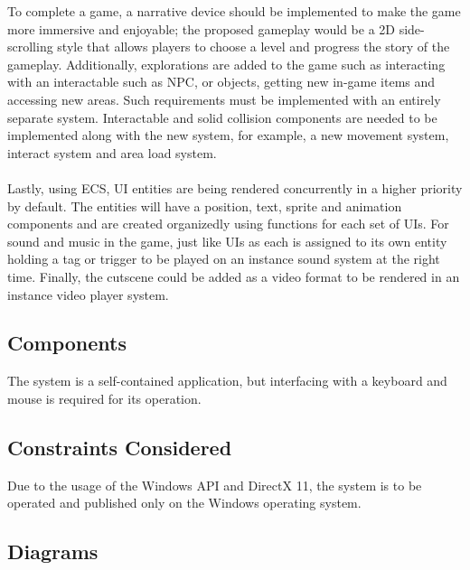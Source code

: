 To complete a game, a narrative device should be implemented to make the game more immersive and enjoyable;
the proposed gameplay would be a 2D side-scrolling style that allows players to choose a level and progress the story of the gameplay.
Additionally, explorations are added to the game such as interacting with an interactable such as NPC, or objects,
getting new in-game items and accessing new areas.
Such requirements must be implemented with an entirely separate system.
Interactable and solid collision components are needed to be implemented along with the new system,
for example, a new movement system, interact system and area load system.
\\\\
Lastly, using ECS, UI entities are being rendered concurrently in a higher priority by default.
The entities will have a position, text, sprite and animation components and are created organizedly using functions for each set of UIs.
For sound and music in the game, just like UIs as each is assigned to its own entity holding a tag or trigger to be played on an instance sound system at the right time.
Finally, the cutscene could be added as a video format to be rendered in an instance video player system.



\subsection{Components}
\label{subsec:components}

The system is a self-contained application, but interfacing with a keyboard and mouse is required for its operation.



\subsection{Constraints Considered}
\label{subsec:constraints-considered}

Due to the usage of the Windows API and DirectX 11, the system is to be operated and published only on
the Windows operating system.

\subsection{Diagrams}
\label{subsec:diagrams}

\vspace{0.5cm}


